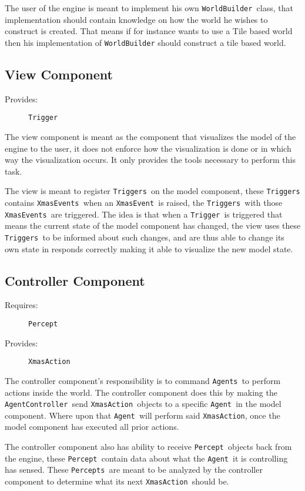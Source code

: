 The user of the engine is meant to implement his own \texttt{WorldBuilder
}class, that implementation should contain knowledge on how the world
he wishes to construct is created. That means if for instance wants
to use a Tile based world then his implementation of \texttt{WorldBuilder}
should construct a tile based world.


\subsection{View Component}
\begin{description}
\item [{Provides:}] \texttt{Trigger}
\end{description}
The view component is meant as the component that visualizes the model
of the engine to the user, it does not enforce how the visualization
is done or in which way the visualization occurs. It only provides
the tools necessary to perform this task.

The view is meant to register \texttt{Triggers }on the model component,
these \texttt{Triggers }contains \texttt{XmasEvents }when an \texttt{XmasEvent
}is raised, the \texttt{Triggers }with those \texttt{XmasEvents }are
triggered. The idea is that when a \texttt{Trigger }is triggered that
means the current state of the model component has changed, the view
uses these \texttt{Triggers }to be informed about such changes, and
are thus able to change its own state in responds correctly making
it able to visualize the new model state. 


\subsection{Controller Component}
\begin{description}
\item [{Requires:}] \texttt{Percept }
\item [{Provides:}] \texttt{XmasAction}
\end{description}
The controller component\textquoteright{}s responsibility is to command
\texttt{Agents }to perform actions inside the world. The controller
component does this by making the \texttt{AgentController }send \texttt{XmasAction
}objects to a specific \texttt{Agent }in the model component. Where
upon that \texttt{Agent }will perform said \texttt{XmasAction}, once
the model component has executed all prior actions.

The controller component also has ability to receive \texttt{Percept
}objects back from the engine, these \texttt{Percept }contain data
about what the \texttt{Agent }it is controlling has sensed. These
\texttt{Percepts }are meant to be analyzed by the controller component
to determine what its next \texttt{XmasAction }should be. 

